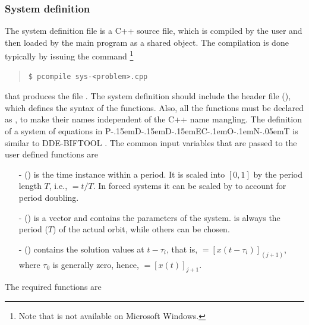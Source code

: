 \documentclass[10pt,a4paper]{ddedoc}
\def\pdde{{P\kern-.15emD\kern-.15emD\kern-.15emE\raisebox{.25ex}{-}C\kern-.1emO\kern-.1emN\kern-.05emT}}
\begin{document}
\subsubsection{System definition}\label{sysdef}

The system definition file is a C++ source file, which is compiled by the user
and then loaded by the main program  as a shared object. The
compilation is done typically by issuing the command%
\footnote{Note that  is not available on Microsoft Windows.}
{ \small \begin{quote} \begin{lstlisting}[basicstyle=\tt,frame=single]
$ pcompile sys-<problem>.cpp
\end{lstlisting} \end{quote} } \noindent
that produces the file .
The system definition should include the header file 
(), which defines the syntax of the functions. Also, all
the functions must be declared as , to make their names
independent of the C++ name mangling. The definition of a system of equations in
\pdde{} is similar to DDE-BIFTOOL \cite{DDEBIF}. The common input variables that
are passed to the user defined functions are
\begin{itemize}
  \item[-]  () is the time instance within a period. It is
  scaled into $[ 0, 1 ]$ by the period length $T$, i.e., $ = t/T$. In forced systems
  it can be scaled by  to account for period doubling.
  \item[-]  () is a vector and contains the parameters of
  the system.  is always the period ($T$) of the actual orbit,
  while others can be chosen.
  \item[-]  () contains the solution values at $t -
  \tau_i$, that is, $= [ x ( t - \tau_i ) ]_{(j+1)}$, where
$\tau_0$ is generally zero, hence, $=[x(t)]_{j+1}$.
\end{itemize}
The required functions are
\end{document}
